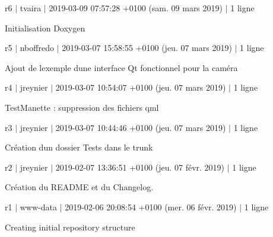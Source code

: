 r6 $\vert$ tvaira $\vert$ 2019-\/03-\/09 07\+:57\+:28 +0100 (sam. 09 mars 2019) $\vert$ 1 ligne

Initialisation Doxygen

r5 $\vert$ nboffredo $\vert$ 2019-\/03-\/07 15\+:58\+:55 +0100 (jeu. 07 mars 2019) $\vert$ 1 ligne

Ajout de l\textquotesingle{}exemple d\textquotesingle{}une interface Qt fonctionnel pour la caméra

r4 $\vert$ jreynier $\vert$ 2019-\/03-\/07 10\+:54\+:07 +0100 (jeu. 07 mars 2019) $\vert$ 1 ligne

Test\+Manette \+: suppression des fichiers qml

r3 $\vert$ jreynier $\vert$ 2019-\/03-\/07 10\+:44\+:46 +0100 (jeu. 07 mars 2019) $\vert$ 1 ligne

Création d\textquotesingle{}un dossier Tests dans le trunk

r2 $\vert$ jreynier $\vert$ 2019-\/02-\/07 13\+:36\+:51 +0100 (jeu. 07 févr. 2019) $\vert$ 1 ligne

Création du R\+E\+A\+D\+ME et du Changelog.

r1 $\vert$ www-\/data $\vert$ 2019-\/02-\/06 20\+:08\+:54 +0100 (mer. 06 févr. 2019) $\vert$ 1 ligne

Creating initial repository structure 